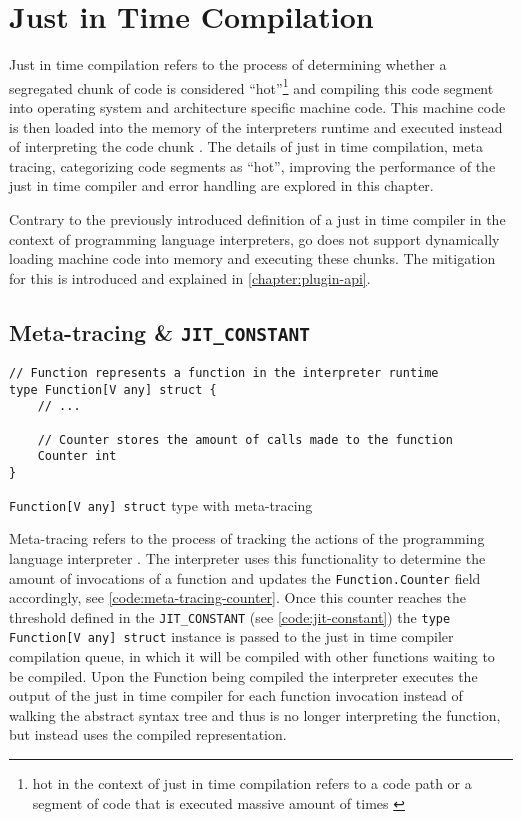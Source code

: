 \chapter{Just in Time Compilation}

Just in time compilation refers to the process of determining whether a
segregated chunk of code is considered ``hot''\footnote{hot in the context of
just in time compilation refers to a code path or a segment of code that is
executed massive amount of times \cite{jvm_ibm_optlevel, jvm_efficient}} and
compiling this code segment into operating system and architecture specific
machine code. This machine code is then loaded into the memory of the
interpreters runtime and executed instead of interpreting the code chunk
\cite{jvm_efficient}. The details of just in time compilation, meta tracing,
categorizing code segments as ``hot'', improving the performance of the just in
time compiler and error handling are explored in this chapter.

Contrary to the previously introduced definition of a just in time
compiler in the context of programming language interpreters, go does
not support dynamically loading machine code into memory and executing
these chunks. The mitigation for this is introduced and explained in
\autoref{chapter:plugin-api}.

\section{Meta-tracing \& \texttt{JIT\_CONSTANT}}

\begin{listing}[H]
    \begin{verbatim}
// Function represents a function in the interpreter runtime
type Function[V any] struct {
    // ...

    // Counter stores the amount of calls made to the function
    Counter int
}
    \end{verbatim}
    \caption{\texttt{Function[V any] struct} type with meta-tracing}
    \label{code:meta-tracing-counter}
\end{listing}

Meta-tracing refers to the process of tracking the actions of the programming
language interpreter \cite[4.1 Meta-tracing]{bolz2015impact}. The interpreter
uses this functionality to determine the amount of invocations of a function
and updates the \texttt{Function.Counter} field accordingly, see
\autoref{code:meta-tracing-counter}. Once this counter reaches the threshold
defined in the \texttt{JIT\_CONSTANT} (see \autoref{code:jit-constant}) the
\texttt{type Function[V any] struct} instance is passed to the just in
time compiler compilation queue, in which it will be compiled with other
functions waiting to be compiled. Upon the Function being compiled the
interpreter executes the output of the just in time compiler for each function
invocation instead of walking the abstract syntax tree and thus is no longer
interpreting the function, but instead uses the compiled representation.

